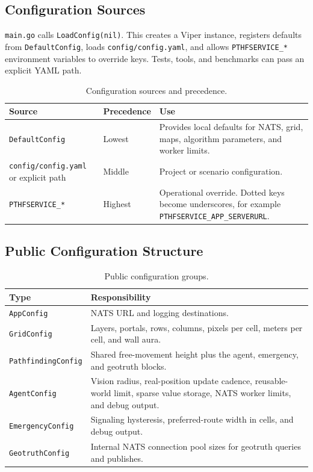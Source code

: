 \documentclass[12pt,a4paper]{report}
\begin{document}
\subsection{Configuration Sources}

\texttt{main.go} calls \texttt{LoadConfig(nil)}. This creates a Viper instance,
registers defaults from \texttt{DefaultConfig}, loads
\texttt{config/config.yaml}, and allows \texttt{PTHFSERVICE\_*} environment
variables to override keys. Tests, tools, and benchmarks can pass an explicit
YAML path.

\begin{table}[H]
\centering
\begin{tabular}{|p{}|p{}|p{}|}
\hline
\textbf{Source} & \textbf{Precedence} & \textbf{Use} \\
\hline
\texttt{DefaultConfig} &
Lowest &
Provides local defaults for NATS, grid, maps, algorithm parameters, and worker
limits. \\
\hline
\texttt{config/config.yaml} or explicit path &
Middle &
Project or scenario configuration. \\
\hline
\texttt{PTHFSERVICE\_*} &
Highest &
Operational override. Dotted keys become underscores, for example
\texttt{PTHFSERVICE\_APP\_SERVERURL}. \\
\hline
\end{tabular}
\caption{Configuration sources and precedence.}
\end{table}

\subsection{Public Configuration Structure}

\begin{table}[H]
\centering
\begin{tabular}{|p{}|p{}|}
\hline
\textbf{Type} & \textbf{Responsibility} \\
\hline
\texttt{AppConfig} &
NATS URL and logging destinations. \\
\hline
\texttt{GridConfig} &
Layers, portals, rows, columns, pixels per cell, meters per cell, and wall aura. \\
\hline
\texttt{PathfindingConfig} &
Shared free-movement height plus the agent, emergency, and geotruth blocks. \\
\hline
\texttt{AgentConfig} &
Vision radius, real-position update cadence, reusable-world limit, sparse value
storage, NATS worker limits, and debug output. \\
\hline
\texttt{EmergencyConfig} &
Signaling hysteresis, preferred-route width in cells, and debug output. \\
\hline
\texttt{GeotruthConfig} &
Internal NATS connection pool sizes for geotruth queries and publishes. \\
\hline
\end{tabular}
\caption{Public configuration groups.}
\end{table}
\end{document}
